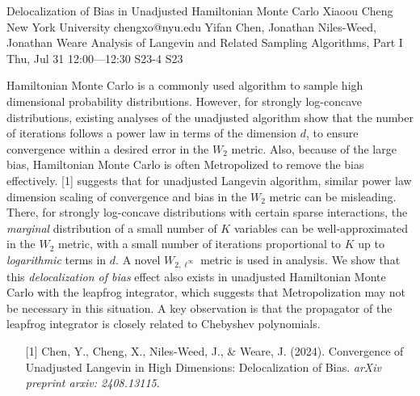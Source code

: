 \begin{talk}
  {Delocalization of Bias in Unadjusted Hamiltonian Monte Carlo}%
  {Xiaoou Cheng}%
  {New York University}%
  {chengxo@nyu.edu}%
  {Yifan Chen, Jonathan Niles-Weed, Jonathan Weare}%
  {Analysis of Langevin and Related Sampling Algorithms, Part I}%
  {Thu, Jul 31 12:00---12:30}%
  {S23-4}%
  {S23}%
    
   
Hamiltonian Monte Carlo is a commonly used algorithm to sample high dimensional probability distributions. However, for strongly log-concave distributions, existing analyses of the unadjusted algorithm show that the number of iterations follows a power law in terms of the dimension $d$, to ensure convergence within a desired error in the $W_2$ metric. Also, because of the large bias, Hamiltonian Monte Carlo is often Metropolized to remove the bias effectively. [1] suggests that for unadjusted Langevin algorithm, similar power law dimension scaling of convergence and bias in the $W_2$ metric can be misleading. There, for strongly log-concave distributions with certain sparse interactions, the \emph{marginal} distribution of a small number of $K$ variables can be well-approximated in the $W_2$ metric, with a small number of iterations proportional to $K$ up to \emph{logarithmic} terms in $d$. A novel $W_{2,\ell^\infty}$ metric is used in analysis. We show that this \emph{delocalization of bias} effect also exists in unadjusted Hamiltonian Monte Carlo with the leapfrog integrator, which suggests that Metropolization may not be necessary in this situation. A key observation is that the propagator of the leapfrog integrator is closely related to Chebyshev polynomials.

\medskip

\begin{enumerate}
 \item[{[1]}] Chen, Y., Cheng, X., Niles-Weed, J., \& Weare, J. (2024). Convergence of Unadjusted Langevin in High Dimensions: Delocalization of Bias. \textit{arXiv preprint arxiv: 2408.13115}.
\end{enumerate}

\end{talk}

